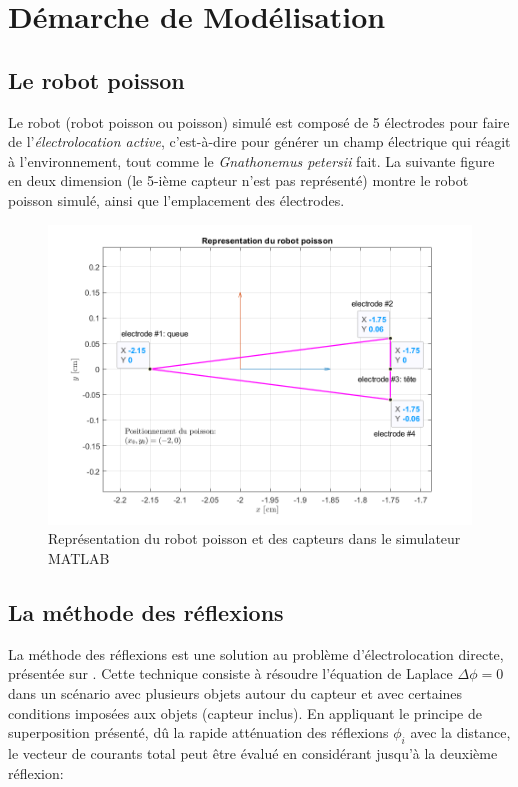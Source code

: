 \section{Démarche de Modélisation}
\subsection{Le robot poisson}

Le robot (robot poisson ou poisson) simulé est composé de 5 électrodes pour faire de l'\textit{électrolocation active}, c'est-à-dire pour générer un champ électrique qui réagit à l'environnement, tout comme le \textit{Gnathonemus petersii} fait. La suivante figure en deux dimension (le 5-ième capteur n'est pas représenté) montre le robot poisson simulé, ainsi que l'emplacement des électrodes. 

\begin{figure}[h!]
    \centering
    \includegraphics[width=\textwidth]{assets/poisson/poisson.png}
    \caption{Représentation du robot poisson et des capteurs dans le simulateur MATLAB}
    \label{fig:poisson}
\end{figure}

\subsection{La méthode des réflexions}
La méthode des réflexions est une solution au problème d'électrolocation directe, présentée sur \cite{Boyer2012}. Cette technique consiste à résoudre l'équation de Laplace $\Delta\phi = 0$ dans un scénario avec plusieurs objets autour du capteur et avec certaines conditions imposées aux objets (capteur inclus). En appliquant le principe de superposition présenté, dû la rapide atténuation des réflexions $\phi_i$ avec la distance, le vecteur de courants total peut être évalué en considérant jusqu'à la deuxième réflexion: 


